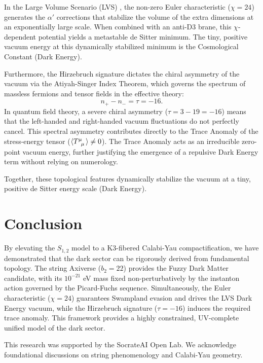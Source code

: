 \documentclass[aps,prd,twocolumn,nofootinbib,superscriptaddress,10pt]{revtex4-2}
\begin{document}
In the Large Volume Scenario (LVS) \cite{Balasubramanian2005}, the non-zero Euler characteristic ($\chi = 24$) generates the $\alpha'$ corrections that stabilize the volume of the extra dimensions at an exponentially large scale. When combined with an anti-D3 brane, this $\chi$-dependent potential yields a metastable de Sitter minimum. The tiny, positive vacuum energy at this dynamically stabilized minimum is the Cosmological Constant (Dark Energy).

Furthermore, the Hirzebruch signature dictates the chiral asymmetry of the vacuum via the Atiyah-Singer Index Theorem, which governs the spectrum of massless fermions and tensor fields in the effective theory:
\begin{equation}
    n_+ - n_- = \tau = -16.
\end{equation}
In quantum field theory, a severe chiral asymmetry ($\tau = 3 - 19 = -16$) means that the left-handed and right-handed vacuum fluctuations do not perfectly cancel. This spectral asymmetry contributes directly to the Trace Anomaly of the stress-energy tensor ($\langle \tensor{T}{^\mu_\mu} \rangle \neq 0$). The Trace Anomaly acts as an irreducible zero-point vacuum energy, further justifying the emergence of a repulsive Dark Energy term without relying on numerology.

Together, these topological features dynamically stabilize the vacuum at a tiny, positive de Sitter energy scale (Dark Energy).

\section{Conclusion}

By elevating the $S_{1,2}$ model to a K3-fibered Calabi-Yau compactification, we have demonstrated that the dark sector can be rigorously derived from fundamental topology. The string Axiverse ($b_2=22$) provides the Fuzzy Dark Matter candidate, with its $10^{-21}$ eV mass fixed non-perturbatively by the instanton action governed by the Picard-Fuchs sequence. Simultaneously, the Euler characteristic ($\chi=24$) guarantees Swampland evasion and drives the LVS Dark Energy vacuum, while the Hirzebruch signature ($\tau=-16$) induces the required trace anomaly. This framework provides a highly constrained, UV-complete unified model of the dark sector.

\begin{acknowledgments}
This research was supported by the SocrateAI Open Lab. We acknowledge foundational discussions on string phenomenology and Calabi-Yau geometry.
\end{acknowledgments}
\end{document}
